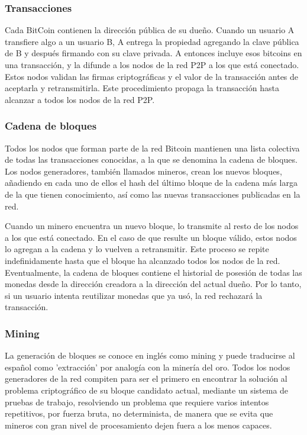 \subsubsection{Transacciones}

Cada BitCoin contienen la direcci\'on p\'ublica de su due\~no. Cuando un usuario A transfiere algo a un usuario B, A entrega la propiedad agregando la clave p\'ublica de B y despu\'es firmando con su clave privada. A entonces incluye esos bitcoins en una transacci\'on, y la difunde a los nodos de la red P2P a los que est\'a conectado. Estos nodos validan las firmas criptogr\'aficas y el valor de la transacci\'on antes de aceptarla y retransmitirla. Este procedimiento propaga la transacci\'on hasta alcanzar a todos los nodos de la red P2P.

\subsubsection{Cadena de bloques}

Todos los nodos que forman parte de la red Bitcoin mantienen una lista colectiva de todas las transacciones conocidas, a la que se denomina la cadena de bloques. Los nodos generadores, tambi\'en llamados mineros, crean los nuevos bloques, a\~nadiendo en cada uno de ellos el hash del \'ultimo bloque de la cadena m\'as larga de la que tienen conocimiento, as\'i como las nuevas transacciones publicadas en la red.

Cuando un minero encuentra un nuevo bloque, lo transmite al resto de los nodos a los que est\'a conectado. En el caso de que resulte un bloque v\'alido, estos nodos lo agregan a la cadena y lo vuelven a retransmitir. Este proceso se repite indefinidamente hasta que el bloque ha alcanzado todos los nodos de la red. Eventualmente, la cadena de bloques contiene el historial de posesi\'on de todas las monedas desde la direcci\'on creadora a la direcci\'on del actual due\~no. Por lo tanto, si un usuario intenta reutilizar monedas que ya us\'o, la red rechazar\'a la transacci\'on.

\subsubsection{Mining}

La generaci\'on de bloques se conoce en ingl\'es como mining y puede traducirse al espa\~nol como 'extracci\'on' por analog\'ia con la miner\'ia del oro. Todos los nodos generadores de la red compiten para ser el primero en encontrar la soluci\'on al problema criptogr\'afico de su bloque candidato actual, mediante un sistema de pruebas de trabajo, resolviendo un problema que requiere varios intentos repetitivos, por fuerza bruta, no determinista, de manera que se evita que mineros con gran nivel de procesamiento dejen fuera a los menos capaces.


